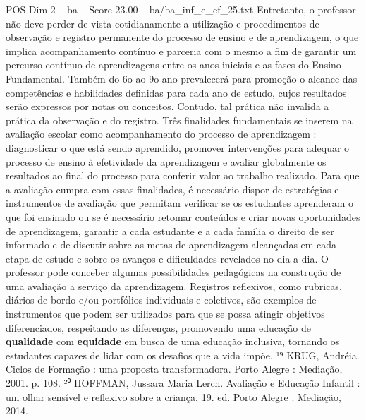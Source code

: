 \begin{textsample}{POS Dim 2 – ba – Score 23.00 – ba/ba\_inf\_e\_ef\_25.txt}
Entretanto, o professor não deve perder de vista cotidianamente a utilização e procedimentos de observação e registro permanente do processo de ensino e de aprendizagem, o que implica acompanhamento contínuo e parceria com o mesmo a fim de garantir um percurso contínuo de aprendizagens entre os anos iniciais e as fases do Ensino Fundamental.
Também do 6o ao 9o ano prevalecerá para promoção o alcance das competências e habilidades definidas para cada ano de estudo, cujos resultados serão expressos por notas ou conceitos.
Contudo, tal prática não invalida a prática da observação e do registro.
Três finalidades fundamentais se inserem na avaliação escolar como acompanhamento do processo de aprendizagem : diagnosticar o que está sendo aprendido, promover intervenções para adequar o processo de ensino à efetividade da aprendizagem e avaliar globalmente os resultados ao final do processo para conferir valor ao trabalho realizado.
Para que a avaliação cumpra com essas finalidades, é necessário dispor de estratégias e instrumentos de avaliação que permitam verificar se os estudantes aprenderam o que foi ensinado ou se é necessário retomar conteúdos e criar novas oportunidades de aprendizagem, garantir a cada estudante e a cada família o direito de ser informado e de discutir sobre as metas de aprendizagem alcançadas em cada etapa de estudo e sobre os avanços e dificuldades revelados no dia a dia.
O professor pode conceber algumas possibilidades pedagógicas na construção de uma avaliação a serviço da aprendizagem.
Registros reflexivos, como rubricas, diários de bordo e/ou portfólios individuais e coletivos, são exemplos de instrumentos que podem ser utilizados para que se possa atingir objetivos diferenciados, respeitando as diferenças, promovendo uma educação de \textbf{qualidade} com \textbf{equidade} em busca de uma educação inclusiva, tornando os estudantes capazes de lidar com os desafios que a vida impõe. ¹⁹ KRUG, Andréia.
Ciclos de Formação : uma proposta transformadora.
Porto Alegre : Mediação, 2001. p. 108. ²⁰ HOFFMAN, Jussara Maria Lerch.
Avaliação e Educação Infantil : um olhar sensível e reflexivo sobre a criança. 19. ed.
Porto Alegre : Mediação, 2014.

\end{textsample}
